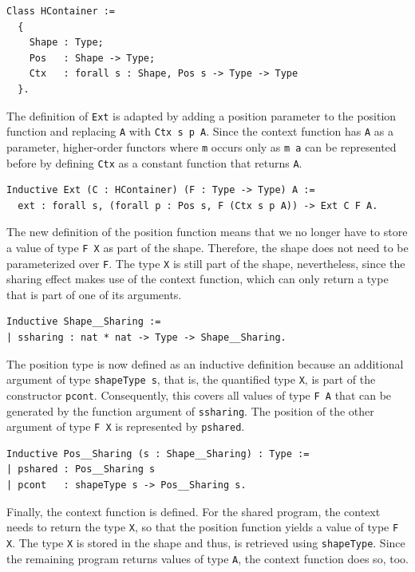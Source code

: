 \documentclass[a4paper, 11pt, fleqn, twoside]{scrreprt}
\newcommand{\hinl}[1]{\texttt{#1}}
\newcommand{\cinl}[1]{\texttt{#1}}
\begin{document}
\begin{verbatim}
Class HContainer :=
  {
    Shape : Type;
    Pos   : Shape -> Type;
    Ctx   : forall s : Shape, Pos s -> Type -> Type
  }.
\end{verbatim}

The definition of \cinl{Ext} is adapted by adding a position parameter to the position function and replacing \cinl{A} with \cinl{Ctx s p A}.
Since the context function has \cinl{A} as a parameter, higher-order functors where \hinl{m} occurs only as \hinl{m a} can be represented before by defining \cinl{Ctx} as a constant function that returns \cinl{A}.
 
\begin{verbatim}
Inductive Ext (C : HContainer) (F : Type -> Type) A :=
  ext : forall s, (forall p : Pos s, F (Ctx s p A)) -> Ext C F A.
\end{verbatim}

The new definition of the position function means that we no longer have to store a value of type \cinl{F X} as part of the shape.
Therefore, the shape does not need to be parameterized over \cinl{F}.
The type \cinl{X} is still part of the shape, nevertheless, since the sharing effect makes use of the context function, which can only return a type that is part of one of its arguments.

\begin{verbatim}
Inductive Shape__Sharing :=
| ssharing : nat * nat -> Type -> Shape__Sharing.
\end{verbatim}

The position type is now defined as an inductive definition because an additional argument of type \cinl{shapeType s}, that is, the quantified type \cinl{X}, is part of the constructor \cinl{pcont}.
Consequently, this covers all values of type \cinl{F A} that can be generated by the function argument of \cinl{ssharing}.
The position of the other argument of type \cinl{F X} is represented by \cinl{pshared}.

\begin{verbatim}
Inductive Pos__Sharing (s : Shape__Sharing) : Type :=
| pshared : Pos__Sharing s
| pcont   : shapeType s -> Pos__Sharing s.
\end{verbatim}

Finally, the context function is defined.
For the shared program, the context needs to return the type \cinl{X}, so that the position function yields a value of type \cinl{F X}.
The type \cinl{X} is stored in the shape and thus, is retrieved using \cinl{shapeType}.
Since the remaining program returns values of type \cinl{A}, the context function does so, too.
\end{document}
